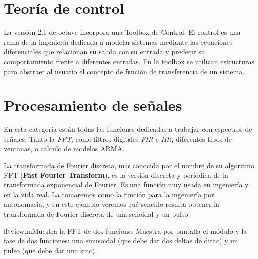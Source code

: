 
\section{Teoría de control}


La versión 2.1 de octave incorpora  una Toolbox de Control. El control
es una rama de la ingeniería  dedicada a modelar sistemas mediante las
ecuaciones diferenciales  que relacionan  su salida  con su  entrada y
predecir su comportamiento frente a diferentes entradas. En la toolbox
se  utilizan  estructuras para  abstraer  al  usuario el  concepto  de
función de transferencia de un sistema.


\section{Procesamiento de señales}


En esta categoría  están todas las funciones dedicadas  a trabajar con
espectros de señales. Tanto la  {\em FFT}, como filtros digitales {\em
FIR} e {\em  IIR}, diferentes tipos de ventanas, o  cálculo de modelos
ARMA.

La transformada de Fourier discreta, más  conocida por el nombre de su
algoritmo FFT ({\bf Fast Fourier Transform}), es la versión discreta y
periódica de  la transformada exponencial  de Fourier. Es  una función
muy  usada en  ingeniería y  en  la vida  real. La  tomaremos como  la
función para la ingeniería por  antonomasia, y en este ejemplo veremos
qué sencillo  resulta obtener la  transformada de Fourier  discreta de
una senoidal y un pulso.

\begin{ejemplo}{fftview.m}{Muestra  la FFT  de dos  funciones} Muestra
por pantalla el módulo y la fase de dos funciones: una sinusoidal (que
debe dar dos deltas de dirac) y un pulso (que debe dar una sinc).
\end{ejemplo}

\begin{figure}[hbtp]
\centering
{}
\end{figure}

